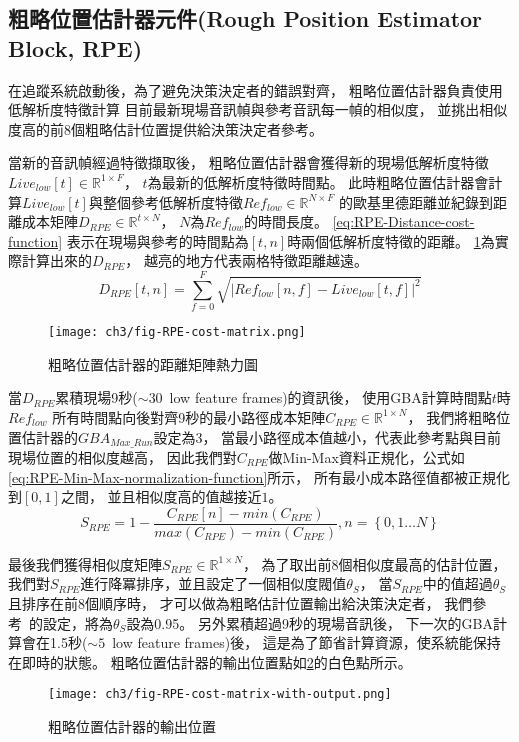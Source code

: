 \documentclass[class=NCU_thesis, crop=false]{standalone}
\begin{document}
\subsection{粗略位置估計器元件(Rough Position Estimator Block, RPE)} \label{ch3-subst-RPE}
在追蹤系統啟動後，為了避免決策決定者的錯誤對齊，
粗略位置估計器負責使用低解析度特徵計算
目前最新現場音訊幀與參考音訊每一幀的相似度，
並挑出相似度高的前8個粗略估計位置提供給決策決定者參考。

當新的音訊幀經過特徵擷取後，
粗略位置估計器會獲得新的現場低解析度特徵$Live_{low}[t] \in \mathbb{R}^{1 \times F}$，
$t$為最新的低解析度特徵時間點。
此時粗略位置估計器會計算$Live_{low}[t]$與整個參考低解析度特徵$Ref_{low} \in \mathbb{R}^{N \times F}$
的歐基里德距離並紀錄到距離成本矩陣$D_{RPE} \in \mathbb{R}^{t \times N}$，
$N$為$Ref_{low}$的時間長度。
\cref{eq:RPE-Distance-cost-function}
表示在現場與參考的時間點為$[t, n]$時兩個低解析度特徵的距離。
\cref{fig:fig-ch3-RPE-cost-matrix}為實際計算出來的$D_{RPE}$，
越亮的地方代表兩格特徵距離越遠。
\begin{equation}
    \label{eq:RPE-Distance-cost-function}
    D_{RPE}[t, n] = \sum_{f = 0}^{F}\sqrt{
    \left\lvert Ref_{low}[n, f]-Live_{low}[t, f]\right\rvert^{2}} 
\end{equation}

\begin{figure}[H]
    \centering
    \texttt{[image: ch3/fig-RPE-cost-matrix.png]}
    \caption{粗略位置估計器的距離矩陣熱力圖}
    \label{fig:fig-ch3-RPE-cost-matrix}
\end{figure}

當$D_{RPE}$累積現場9秒($\sim 30$\ low feature frames)的資訊後，
使用GBA計算時間點$t$時$Ref_{low}$
所有時間點向後對齊9秒的最小路徑成本矩陣$C_{RPE} \in \mathbb{R}^{1 \times N}$，
我們將粗略位置估計器的$GBA_{Max\_Run}$設定為3，
當最小路徑成本值越小，代表此參考點與目前現場位置的相似度越高，
因此我們對$C_{RPE}$做Min-Max資料正規化，公式如\cref{eq:RPE-Min-Max-normalization-function}所示，
所有最小成本路徑值都被正規化到$[0,1]$之間，
並且相似度高的值越接近$1$。
\begin{equation}
    \label{eq:RPE-Min-Max-normalization-function}
    S_{RPE} = 1-\frac{C_{RPE}[n]-min(C_{RPE})}{max(C_{RPE})-min(C_{RPE})},
    n = \left\{0, 1 \ldots N\right\} 
\end{equation}

最後我們獲得相似度矩陣$S_{RPE} \in \mathbb{R}^{1 \times N}$，
為了取出前8個相似度最高的估計位置，
我們對$S_{RPE}$進行降冪排序，並且設定了一個相似度閥值$\theta _{S}$，
當$S_{RPE}$中的值超過$\theta _{S}$且排序在前8個順序時，
才可以做為粗略估計位置輸出給決策決定者，
我們參考~\cite{Arzt2010Towards}的設定，將為$\theta _{S}$設為0.95。
另外累積超過9秒的現場音訊後，
下一次的GBA計算會在1.5秒($\sim 5$\ low feature frames)後，
這是為了節省計算資源，使系統能保持在即時的狀態。
粗略位置估計器的輸出位置點如\cref{fig:fig-ch3-RPE-cost-matrix-with-output}的白色點所示。
\begin{figure}[H]
    \centering
    \texttt{[image: ch3/fig-RPE-cost-matrix-with-output.png]}
    \caption{粗略位置估計器的輸出位置}
    \label{fig:fig-ch3-RPE-cost-matrix-with-output}
\end{figure}
\end{document}
